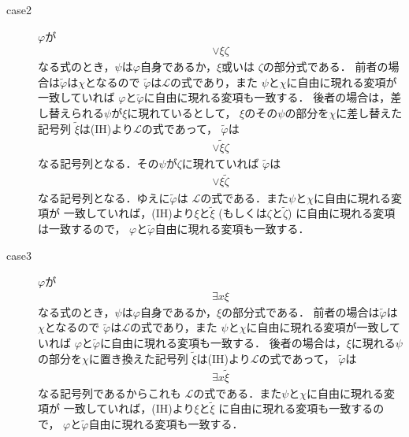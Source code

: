 \begin{metaprf}
\begin{description}
\begin{description}
					\item[case2] $\varphi$が
						\begin{align}
							\vee \xi \zeta
						\end{align}
						なる式のとき，$\psi$は$\varphi$自身であるか，$\xi$或いは
						$\zeta$の部分式である．
						前者の場合は$\widetilde{\varphi}$は$\chi$となるので
						$\widetilde{\varphi}$は$\mathcal{L}$の式であり，また
						$\psi$と$\chi$に自由に現れる変項が一致していれば
						$\varphi$と$\widetilde{\varphi}$に自由に現れる変項も一致する．
						後者の場合は，差し替えられる$\psi$が$\xi$に現れているとして，
						$\xi$のその$\psi$の部分を$\chi$に差し替えた記号列
						$\widetilde{\xi}$は(IH)より$\mathcal{L}$の式であって，
						$\widetilde{\varphi}$は
						\begin{align}
							\vee \widetilde{\xi} \zeta
						\end{align}
						なる記号列となる．その$\psi$が$\zeta$に現れていれば
						$\widetilde{\varphi}$は
						\begin{align}
							\vee \xi \widetilde{\zeta}
						\end{align}
						なる記号列となる．ゆえに$\widetilde{\varphi}$は
						$\mathcal{L}$の式である．また$\psi$と$\chi$に自由に現れる変項が
						一致していれば，(IH)より$\xi$と$\widetilde{\xi}$
						(もしくは$\zeta$と$\widetilde{\zeta}$)
						に自由に現れる変項は一致するので，
						$\varphi$と$\widetilde{\varphi}$自由に現れる変項も一致する．
						
					\item[case3] $\varphi$が
						\begin{align}
							\exists x \xi
						\end{align}
						なる式のとき，$\psi$は$\varphi$自身であるか，$\xi$の部分式である．
						前者の場合は$\widetilde{\varphi}$は$\chi$となるので
						$\widetilde{\varphi}$は$\mathcal{L}$の式であり，また
						$\psi$と$\chi$に自由に現れる変項が一致していれば
						$\varphi$と$\widetilde{\varphi}$に自由に現れる変項も一致する．
						後者の場合は，$\xi$に現れる$\psi$の部分を$\chi$に置き換えた記号列
						$\widetilde{\xi}$は(IH)より$\mathcal{L}$の式であって，
						$\widetilde{\varphi}$は
						\begin{align}
							\exists x \widetilde{\xi}
						\end{align}
						なる記号列であるからこれも
						$\mathcal{L}$の式である．また$\psi$と$\chi$に自由に現れる変項が
						一致していれば，(IH)より$\xi$と$\widetilde{\xi}$
						に自由に現れる変項も一致するので，
						$\varphi$と$\widetilde{\varphi}$自由に現れる変項も一致する．
						\QED
				\end{description}
		\end{description}
	\end{metaprf}